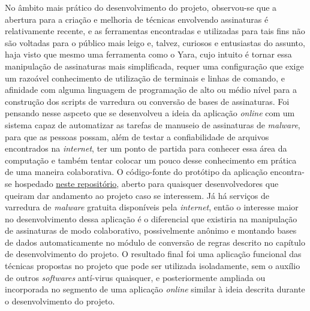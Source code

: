 No âmbito mais prático do desenvolvimento do projeto, observou-se que a abertura
para a criação e melhoria de técnicas envolvendo assinaturas é relativamente
recente, e as ferramentas encontradas e utilizadas para tais fins não são
voltadas para o público mais leigo e, talvez, curiosos e entusiastas do assunto,
haja visto que mesmo uma ferramenta como o Yara, cujo intuito é tornar essa
manipulação de assinaturas mais simplificada, requer uma configuração que exige
um razoável conhecimento de utilização de terminais e linhas de comando, e
afinidade com alguma linguagem de programação de alto ou médio nível para a
construção dos scripts de varredura ou conversão de bases de assinaturas. Foi
pensando nesse aspceto que se desenvolveu a ideia da aplicação \textit{online}
com um sistema capaz de automatizar as tarefas de manuseio de assinaturas de
\textit{malware}, para que as pessoas possam, além de testar a confiabilidade de
arquivos encontrados na \textit{internet}, ter um ponto de partida para conhecer
essa área da computação e também tentar colocar um pouco desse conhecimento em
prática de uma maneira colaborativa. O código-fonte do protótipo da aplicação
encontra-se hospedado \href{https://github.com/ltgouvea/TCC }{neste
repositório},  aberto para quaisquer desenvolvedores que queiram dar andamento
ao projeto caso se interessem. Já há serviços de varredura de \textit{malware}
gratuita disponíveis pela \textit{internet}, então o interesse maior no
desenvolvimento dessa aplicação é o diferencial que existiria na manipulação de
assinaturas de modo colaborativo, possivelmente anônimo e montando bases de
dados automaticamente no módulo de conversão de regras descrito no capítulo de
desenvolvimento do projeto. O resultado final foi uma aplicação funcional das
técnicas propostas no projeto que pode ser utilizada isoladamente, sem o auxílio
de outros \textit{softwares} antí-virus quaisquer, e posteriormente ampliada ou
incorporada no segmento de uma aplicação \textit{online} similar à ideia descrita
durante o desenvolvimento do projeto.
